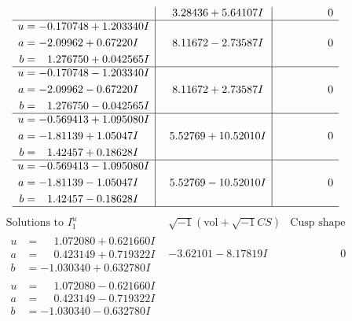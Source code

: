 \documentclass[1p]{elsarticle_modified}
\theoremstyle{definition}
\newcommand{\I}{\sqrt{-1}}
\begin{document}
$$\begin{array}{c|c|c}
 & \phantom{-}3.28436 + 5.64107 I & \phantom{-0.000000 } 0 \\ \hline\begin{aligned}
u &= -0.170748 + 1.203340 I \\
a &= -2.09962 + 0.67220 I \\
b &= \phantom{-}1.276750 + 0.042565 I\end{aligned}
 & \phantom{-}8.11672 - 2.73587 I & \phantom{-0.000000 } 0 \\ \hline\begin{aligned}
u &= -0.170748 - 1.203340 I \\
a &= -2.09962 - 0.67220 I \\
b &= \phantom{-}1.276750 - 0.042565 I\end{aligned}
 & \phantom{-}8.11672 + 2.73587 I & \phantom{-0.000000 } 0 \\ \hline\begin{aligned}
u &= -0.569413 + 1.095080 I \\
a &= -1.81139 + 1.05047 I \\
b &= \phantom{-}1.42457 + 0.18628 I\end{aligned}
 & \phantom{-}5.52769 + 10.52010 I & \phantom{-0.000000 } 0 \\ \hline\begin{aligned}
u &= -0.569413 - 1.095080 I \\
a &= -1.81139 - 1.05047 I \\
b &= \phantom{-}1.42457 - 0.18628 I\end{aligned}
 & \phantom{-}5.52769 - 10.52010 I & \phantom{-0.000000 } 0\\
 \hline 
 \end{array}$$\newpage$$\begin{array}{c|c|c}  
\text{Solutions to }I^u_{1}& \I (\text{vol} + \sqrt{-1}CS) & \text{Cusp shape}\\
 \hline 
\begin{aligned}
u &= \phantom{-}1.072080 + 0.621660 I \\
a &= \phantom{-}0.423149 + 0.719322 I \\
b &= -1.030340 + 0.632780 I\end{aligned}
 & -3.62101 - 8.17819 I & \phantom{-0.000000 } 0 \\ \hline\begin{aligned}
u &= \phantom{-}1.072080 - 0.621660 I \\
a &= \phantom{-}0.423149 - 0.719322 I \\
b &= -1.030340 - 0.632780 I\end{aligned}

\end{array}$$
\end{document}
